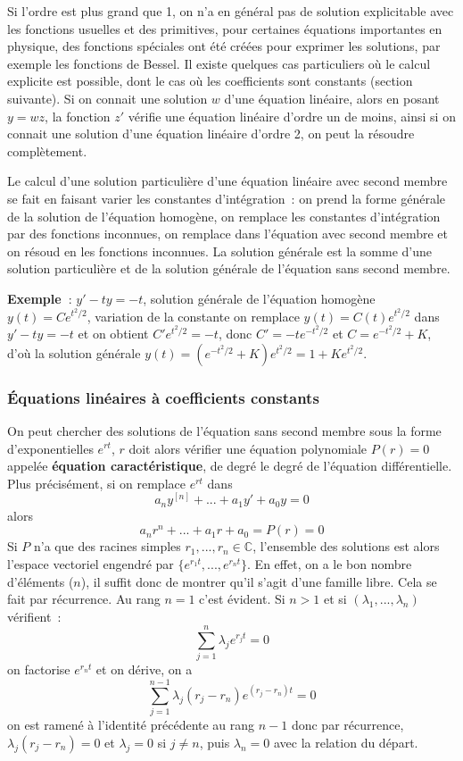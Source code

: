\documentclass[a4paper,11pt]{article}
\newcommand{\C}{{\mathbb{C}}}
\begin{document}
\begin{giacjshere}
Si l'ordre est plus grand que 1, on n'a en g\'en\'eral pas de solution
explicitable avec les fonctions usuelles et des primitives, 
pour certaines \'equations importantes en physique, 
des fonctions sp\'eciales
ont \'et\'e cr\'e\'ees pour exprimer les solutions, par
exemple les fonctions de Bessel. Il existe quelques
cas particuliers o\`u le calcul explicite est possible, dont
le cas o\`u les coefficients sont constants (section suivante).
Si on connait une solution $w$ d'une \'equation lin\'eaire, alors 
en posant $y=wz$, la fonction $z'$ v\'erifie une \'equation lin\'eaire
d'ordre un de moins, ainsi si on connait une solution d'une \'equation
lin\'eaire d'ordre 2, on peut la r\'esoudre compl\`etement.

Le calcul d'une solution particuli\`ere 
d'une \'equation lin\'eaire avec second
membre se fait en faisant varier les constantes d'int\'egration~:
on prend la forme g\'en\'erale de la solution de l'\'equation
homog\`ene,
on remplace les constantes d'int\'egration par des fonctions inconnues,
on remplace dans l'\'equation avec second membre et on
r\'esoud en les fonctions inconnues.
La solution g\'en\'erale est la somme d'une solution particuli\`ere
et de la solution g\'en\'erale de l'\'equation sans second membre.

{\bf Exemple~}: $y'-ty=-t$, solution g\'en\'erale de l'\'equation
homog\`ene $y(t)=Ce^{t^2/2}$, variation de la constante
on remplace $y(t)=C(t)e^{t^2/2}$ dans $y'-ty=-t$ et on obtient
$C' e^{t^2/2}=-t$, donc $C'=-te^{-t^2/2}$ et $C=e^{-t^2/2}+K$,
d'o\`u la solution g\'en\'erale $y(t)=(e^{-t^2/2}+K)e^{t^2/2}=1+Ke^{t^2/2}$.

\subsubsection{\'Equations lin\'eaires \`a coefficients constants}
On peut chercher des solutions de l'\'equation sans second membre
sous la forme d'exponentielles
$e^{rt}$, $r$ doit alors v\'erifier une \'equation polynomiale $P(r)=0$
appel\'ee {\bf \'equation caract\'eristique},
de degr\'e le degr\'e de l'\'equation diff\'erentielle. 
Plus pr\'ecis\'ement, si on remplace $e^{rt}$ dans
$$ a_n y^{[n]}+...+a_1 y'+a_0y=0$$ alors
$$ a_n r^n +...+a_1r +a_0=P(r)=0$$
Si  $P$ n'a que des racines simples $r_1,...,r_n \in \C$, 
l'ensemble des solutions
est alors l'espace vectoriel engendr\'e par 
$\{ e^{r_1t}, ... , e^{r_nt} \}$.
En effet, on a le bon nombre
d'\'el\'ements ($n$), il suffit donc de montrer 
qu'il s'agit d'une famille libre. Cela se fait
par r\'ecurrence. Au rang $n=1$ c'est \'evident.
Si $n>1$ et si $(\lambda_1,...,\lambda_n)$ v\'erifient~:
$$ \sum_{j=1}^n \lambda_j e^{r_jt} = 0$$
on factorise $e^{r_n t}$ et on d\'erive, on a
$$ \sum_{j=1}^{n-1} \lambda_j (r_j-r_n) e^{(r_j-r_n)t} =0 $$
on est ramen\'e \`a l'identit\'e pr\'ec\'edente au rang $n-1$
donc par r\'ecurrence, $\lambda_j (r_j-r_n)=0$ et $\lambda_j=0$
si $j \neq n$, puis $\lambda_n=0$ avec la relation du d\'epart.


\end{giacjshere}
\end{document}
